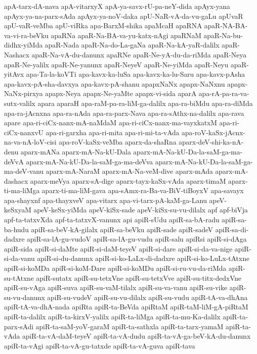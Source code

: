 {apA-tarx-dA-nava
apA-vitarxyX
apA-ya-savx-rU-pa-neY-dida
apAyx-yana
apAyx-ya-na-parx-sAda
apAyx-ya-noV-daka
apU-NaR-vA-da-vu-gaLu
apUvaR
apU-vaR-veMba
apU-viRka
apa-BarxM-shika
apaMcaH
apaRNA
apaR-NA-BA-va-vi-ra-beVku
apaRNa
apaR-Na-BA-va-yu-katx-nAgi
apaRNaM
apaR-Na-bu-didhx-yiMda
apaR-Nada
apaR-Na-do-La-gaNa
apaR-Na-kA-yaR-dalilx
apaR-Nashacx
apaR-Na-vA-du-danunx
apaRNe
apaR-Ne-yA-du-da-riMda
apaR-Neya
apaR-Ne-yalilx
apaR-Ne-yanunx
apaR-NeyeV
apaR-Ne-yiMda
apaR-Neyu
apaR-yitAvx
apa-Ta-la-koVTi
apa-kavx-ka-luSa
apa-kavx-ka-lu-Saru
apa-kavx-pAsha
apa-kavx-pA-sha-davxya
apa-kavx-pA-shanu
apapxNaNx
apapx-NaNxnu
apapx-NaNx-pirxya
apapx-Neya
apapx-Ne-yaMte
apapx-vi-sida
aparA
apa-rA-pa-ra-va-sutx-valilx
apara
aparaH
apa-raM-pa-ra-liM-ga-dalilx
apa-ra-biMdu
apa-ra-diMda
apa-ra-jAcnxna
apa-ra-nAda
apa-ra-parx-Nava
apa-ra-sAthx-na-dalilx
apa-rava
apare
apa-ri-ciCx-nanx-mA-naMdaM
apa-ri-ciCx-nanx-ma-vayxkatxM
apa-ri-ciCx-nanxvU
apa-ri-garxha
apa-ri-mita
apa-ri-mi-ta-vAda
apa-roV-kaSx-jAcnx-na-va-nA-loV-cisi
apa-roV-kaSx-veMba
aparx-da-shaRna
aparx-deV-shi-ka-nA-denu
aparx-mANa
aparx-mA-Na-kU-Dala
aparx-mA-Na-kU-Da-la-saM-ga-ma-deVvA
aparx-mA-Na-kU-Da-la-saM-ga-ma-deVva
aparx-mA-Na-kU-Da-la-saM-ga-ma-deV-vanu
aparx-mA-NaraM
aparx-mA-Na-veM-dive
aparx-mAda
aparx-mA-dashacx
aparx-meVya
aparx-sA-dige
aparx-tayx-kaSx-vAda
aparx-timaM
aparx-ti-ma-liMga
aparx-ti-ma-liM-gava
apa-sAmx-ra-Ba-va-BiV-tiBoyxV
apa-savayx
apa-shayxnf
apa-thayxveV
apa-vitarx
apa-vi-tarx-pA-kaM-ga-Lanu
apeV-keSxyaM
apeV-keSx-yiMda
apeV-kiSx-sade
apeV-kiSx-su-vu-dilalx
apf
apf-biVja
apf-ta-tatxvXda
apf-ta-tatxvX-vanunx
api
apiR-sUdu
apiR-sa-bA-radu
apiR-sa-ba-hudu
apiR-sa-beV-kA-gilalx
apiR-sa-beVku
apiR-sade
apiR-sadeV
apiR-sa-di-dadxre
apiR-sa-lA-gu-vudoV
apiR-sa-lA-gu-vudu
apiR-salu
apiRsi
apiR-si-dAga
apiR-sida
apiR-si-daMte
apiR-si-daM-teyeV
apiR-si-dare
apiR-si-da-va-nige
apiR-si-da-vanu
apiR-si-du-danunx
apiR-si-ko-LaLx-di-dadxre
apiR-si-ko-LuLx-tAtxne
apiR-si-koMDa
apiR-si-koM-Dare
apiR-si-koMDu
apiR-si-ru-vu-da-riMda
apiR-su-tAtxne
apiR-sutatx
apiR-su-tetxVne
apiR-su-tetxVve
apiR-su-titx-dedxVne
apiR-su-vAga
apiR-suva
apiR-su-vaM-tilalx
apiR-su-va-vanu
apiR-su-vike
apiR-su-vu-danunx
apiR-su-vudeV
apiR-su-vu-dilalx
apiR-su-vudu
apiR-tA-va-dhAna
apiR-tA-va-dhA-nada
apiRta
apiR-ta-BeVda
apiRtaM
apiR-taM-liM-gA-piRtaM
apiR-ta-dalilx
apiR-ta-kirxV-yalilx
apiR-ta-liMga
apiR-ta-mu-Ka-dalilx
apiR-ta-parx-sAdi
apiR-ta-saM-yoV-garaM
apiR-ta-sathxla
apiR-ta-tarx-yamaM
apiR-ta-vAda
apiR-ta-vA-daM-teyeV
apiR-ta-vA-dudu
apiR-ta-vA-ga-beV-kA-du-danunx
apiR-ta-vAgi
apiR-ta-vA-gu-tatxde
apiR-ta-vA-guva
apiR-tava
}

